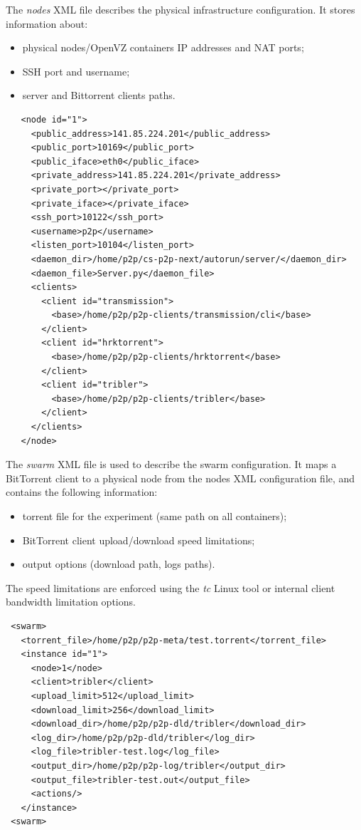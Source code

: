 The \textit{nodes} XML file describes the physical infrastructure
configuration. It stores information about:

\begin{itemize}
 \item physical nodes/OpenVZ containers IP addresses and NAT ports;
 \item SSH port and username;
 \item server and Bittorrent clients paths.
\end{itemize}

\scriptsize
\begin{verbatim}
   <node id="1">
     <public_address>141.85.224.201</public_address>
     <public_port>10169</public_port>
     <public_iface>eth0</public_iface>
     <private_address>141.85.224.201</private_address>
     <private_port></private_port>
     <private_iface></private_iface>
     <ssh_port>10122</ssh_port>
     <username>p2p</username>
     <listen_port>10104</listen_port>
     <daemon_dir>/home/p2p/cs-p2p-next/autorun/server/</daemon_dir>
     <daemon_file>Server.py</daemon_file>
     <clients>
       <client id="transmission">
         <base>/home/p2p/p2p-clients/transmission/cli</base>
       </client>
       <client id="hrktorrent">
         <base>/home/p2p/p2p-clients/hrktorrent</base>
       </client>
       <client id="tribler">
         <base>/home/p2p/p2p-clients/tribler</base>
       </client>
     </clients>
   </node>
\end{verbatim}
\normalsize

The \textit{swarm} XML file is used to describe the swarm configuration. It
maps a BitTorrent client to a physical node from the nodes XML configuration
file, and contains the following information:

\begin{itemize}
  \item torrent file for the experiment (same path on all containers);
  \item BitTorrent client upload/download speed limitations;
  \item output options (download path, logs paths).
\end{itemize}

The speed limitations are enforced using the \textit{tc} Linux tool or
internal client bandwidth limitation options.

\scriptsize
\begin{verbatim}
 <swarm>
   <torrent_file>/home/p2p/p2p-meta/test.torrent</torrent_file>
   <instance id="1">
     <node>1</node>
     <client>tribler</client>
     <upload_limit>512</upload_limit>
     <download_limit>256</download_limit>
     <download_dir>/home/p2p/p2p-dld/tribler</download_dir>
     <log_dir>/home/p2p/p2p-dld/tribler</log_dir>
     <log_file>tribler-test.log</log_file>
     <output_dir>/home/p2p/p2p-log/tribler</output_dir>
     <output_file>tribler-test.out</output_file>
     <actions/>
   </instance>
 <swarm>
\end{verbatim}
\normalsize

